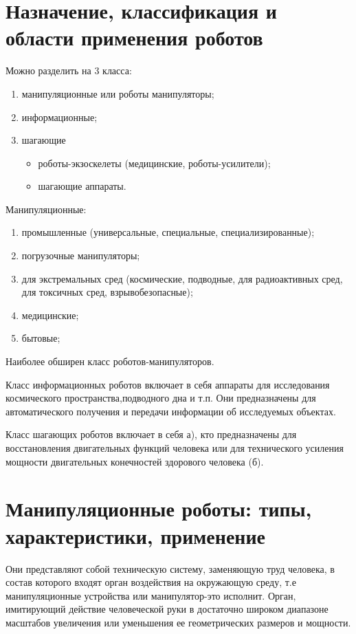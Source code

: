\documentclass[unicode, 12pt, a4paper, oneside]{article}
\begin{document}
\section{Назначение, классификация и области применения роботов}

Можно разделить на 3 класса:
\begin{enumerate}
\item	манипуляционные или роботы манипуляторы;
\item	информационные;
\item шагающие
\begin{itemize}

\item  роботы-экзоскелеты (медицинские, роботы-усилители);
\item шагающие аппараты.
\end{itemize}
\end{enumerate}
Манипуляционные: 
\begin{enumerate}
\item	промышленные (универсальные, специальные, специализированные);
\item погрузочные манипуляторы;
\item	для экстремальных сред (космические, подводные, для радиоактивных сред, для токсичных сред, взрывобезопасные);
\item	медицинские;
\item	бытовые;
\end{enumerate}
Наиболее обширен класс роботов-манипуляторов.

Класс информационных роботов включает в себя аппараты для исследования космического пространства,подводного дна и т.п. Они предназначены для автоматического получения и передачи информации об исследуемых объектах.

Класс шагающих роботов включает в себя а), кто предназначены для восстановления двигательных функций человека или для технического усиления мощности двигательных конечностей здорового человека (б).

\section{Манипуляционные роботы: типы, характеристики, применение}

Они представляют собой техническую систему, заменяющую труд человека, в состав которого входят орган воздействия на окружающую среду, т.е манипуляционные устройства или манипулятор-это исполнит. Орган, имитирующий действие человеческой руки в достаточно широком диапазоне масштабов увеличения или уменьшения ее геометрических размеров и мощности.
\end{document}
